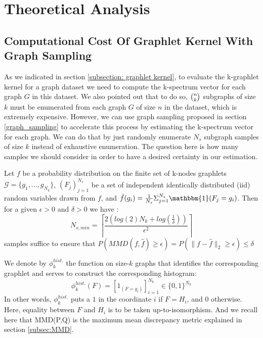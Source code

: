\chapter{Theoretical Analysis}
\label{chapter:analysis}
\section{Computational Cost Of Graphlet Kernel With Graph Sampling}
As we indicated in section \ref{subsection: graphlet kernel}, to evaluate the k-graphlet kernel for a graph dataset we need to compute the k-spectrum vector for each graph $G$ in this dataset. We also pointed out that to do so, $\tbinom{n}{k}$ subgraphs of size $k$ must be enumerated from each graph $G$ of size $n$ in the dataset, which is extremely expensive. However, we can use graph sampling proposed in section \ref{graph_sampling} to accelerate this process by estimating the k-spectrum vector for each graph. We can do that by just randomly enumerate $N_s$ subgraph samples of size $k$ instead of exhaustive enumeration. The question here is how many samples we should consider in order to have a desired certainty in our estimation.
\begin{theorem}
Let $f$ be a probability distribution on the
finite set of k-nodes graphlets  $\mathcal{G}=\{g_1,...,g_{N_k}\}$, ${(F_j)}_{j=1}^{N_s}$ be a set of independent identically distributed (iid) random variables drawn from $f$, and $\hat{f}(g_i)=\frac{1}{N_s}\Sigma_{j=1}^{N_s}\mathbbm{1}(F_j=g_i)$. Then for a given $\epsilon>0$ and $\delta >0$ we have \citep{graphlet_kernel}:
\begin{equation}
N_{s,min}=\left \lceil \frac{2(log(2)N_k+log(\frac{1}{\delta} ))}{\epsilon^2} \right \rceil
\end{equation}
samples suffice to ensure that $P(MMD( f,\hat{f}) \geq \epsilon )=P(\| f-\hat{f} \|_2 \geq \epsilon )\leq\delta$
\end{theorem}
We denote by $\phi_{k}^{hist.}$ the function on size-$k$ graphs that identifies the corresponding graphlet and serves to construct the corresponding histogram:
\[
\phi_k^{hist.}(F) = \left[ 1_{(F = g_i)}\right]_{i=1}^{N_k} \in \{0,1\}^{N_k}
\]
In other words, $\phi_k^{hist.}$ puts a $1$ in the coordinate $i$ if $F=H_i$, and $0$ otherwise. Here, equality between $F$ and $H_i$ is to be taken up-to-isomorphism.
And we recall here that MMD(P,Q) is the maximum mean discrepancy metric explained in section \ref{subsec:MMD}.
